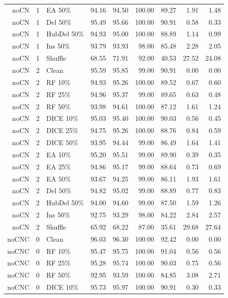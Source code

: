 {\begin{longtable}{rllrrrrrr}
noCN & 1 & EA 50\% & 94.16 & 94.50 & 100.00 & 89.27 & 1.91 & 1.48 \\
noCN & 1 & Del 50\% & 95.49 & 95.66 & 100.00 & 90.91 & 0.58 & 0.33 \\
noCN & 1 & HubDel 50\% & 94.93 & 95.00 & 100.00 & 88.89 & 1.14 & 0.99 \\
noCN & 1 & Ins 50\% & 93.79 & 93.93 & 98.00 & 85.48 & 2.28 & 2.05 \\
noCN & 1 & Shuffle & 68.55 & 71.91 & 92.00 & 40.53 & 27.52 & 24.08 \\
noCN & 2 & Clean & 95.59 & 95.85 & 99.00 & 90.91 & 0.00 & 0.00 \\
noCN & 2 & RF 10\% & 94.93 & 95.26 & 100.00 & 89.52 & 0.67 & 0.60 \\
noCN & 2 & RF 25\% & 94.96 & 95.37 & 99.00 & 89.65 & 0.63 & 0.48 \\
noCN & 2 & RF 50\% & 93.98 & 94.61 & 100.00 & 87.12 & 1.61 & 1.24 \\
noCN & 2 & DICE 10\% & 95.03 & 95.40 & 100.00 & 90.03 & 0.56 & 0.45 \\
noCN & 2 & DICE 25\% & 94.75 & 95.26 & 100.00 & 88.76 & 0.84 & 0.59 \\
noCN & 2 & DICE 50\% & 93.95 & 94.44 & 99.00 & 86.49 & 1.64 & 1.41 \\
noCN & 2 & EA 10\% & 95.20 & 95.51 & 99.00 & 89.90 & 0.39 & 0.35 \\
noCN & 2 & EA 25\% & 94.86 & 95.17 & 99.00 & 88.64 & 0.73 & 0.69 \\
noCN & 2 & EA 50\% & 93.67 & 94.25 & 99.00 & 86.11 & 1.93 & 1.61 \\
noCN & 2 & Del 50\% & 94.82 & 95.02 & 99.00 & 88.89 & 0.77 & 0.83 \\
noCN & 2 & HubDel 50\% & 94.00 & 94.60 & 99.00 & 87.50 & 1.59 & 1.26 \\
noCN & 2 & Ins 50\% & 92.75 & 93.29 & 98.00 & 84.22 & 2.84 & 2.57 \\
noCN & 2 & Shuffle & 65.92 & 68.22 & 87.00 & 35.61 & 29.68 & 27.64 \\
noCNC & 0 & Clean & 96.03 & 96.30 & 100.00 & 92.42 & 0.00 & 0.00 \\
noCNC & 0 & RF 10\% & 95.47 & 95.75 & 100.00 & 91.04 & 0.56 & 0.56 \\
noCNC & 0 & RF 25\% & 95.28 & 95.74 & 100.00 & 90.03 & 0.75 & 0.56 \\
noCNC & 0 & RF 50\% & 92.95 & 93.59 & 100.00 & 84.85 & 3.08 & 2.71 \\
noCNC & 0 & DICE 10\% & 95.73 & 95.97 & 100.00 & 90.91 & 0.30 & 0.33 \\

\end{longtable}}
